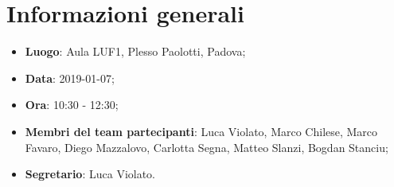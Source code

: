 \section{Informazioni generali}
\begin{itemize}
	\item \textbf{Luogo}: Aula LUF1, Plesso Paolotti, Padova; 
	\item \textbf{Data}: 2019-01-07; 
	\item \textbf{Ora}: 10:30 - 12:30; 
	\item \textbf{Membri del team partecipanti}: Luca Violato, Marco Chilese, Marco Favaro, 
	Diego Mazzalovo, Carlotta Segna, Matteo Slanzi, Bogdan Stanciu; 
	\item \textbf{Segretario}: Luca Violato. 
\end{itemize}






